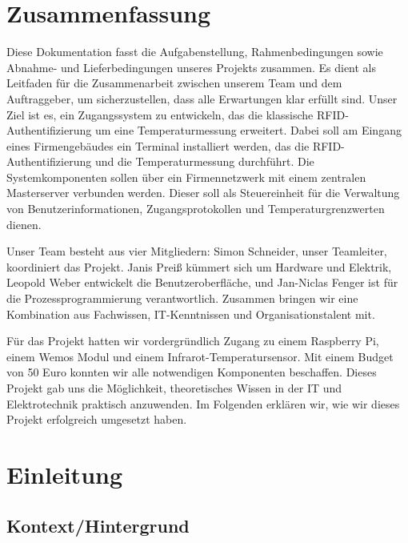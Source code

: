 
\section{Zusammenfassung}\label{sec:zusammenfassung}


Diese Dokumentation fasst die Aufgabenstellung, Rahmenbedingungen sowie Abnahme- und Lieferbedingungen unseres Projekts zusammen. Es dient als Leitfaden für die Zusammenarbeit zwischen unserem Team und dem Auftraggeber, um sicherzustellen, dass alle Erwartungen klar erfüllt sind. Unser Ziel ist es, ein Zugangssystem zu entwickeln, das die klassische RFID-Authentifizierung um eine Temperaturmessung erweitert. Dabei soll am Eingang eines Firmengebäudes ein Terminal installiert werden, das die RFID-Authentifizierung und die Temperaturmessung durchführt. Die Systemkomponenten sollen über ein Firmennetzwerk mit einem zentralen Masterserver verbunden werden. Dieser soll als Steuereinheit für die Verwaltung von Benutzerinformationen, Zugangsprotokollen und Temperaturgrenzwerten dienen.

\vspace{1em}
\noindent Unser Team besteht aus vier Mitgliedern: Simon Schneider, unser Teamleiter, koordiniert das Projekt. Janis Preiß kümmert sich um Hardware und Elektrik, Leopold Weber entwickelt die Benutzeroberfläche, und Jan-Niclas Fenger ist für die Prozessprogrammierung verantwortlich. Zusammen bringen wir eine Kombination aus Fachwissen, IT-Kenntnissen und Organisationstalent mit.

\vspace{1em}
\noindent Für das Projekt hatten wir vordergründlich Zugang zu einem Raspberry Pi, einem Wemos Modul und einem Infrarot-Temperatursensor. Mit einem Budget von 50 Euro konnten wir alle notwendigen Komponenten beschaffen. Dieses Projekt gab uns die Möglichkeit, theoretisches Wissen in der IT und Elektrotechnik praktisch anzuwenden. Im Folgenden erklären wir, wie wir dieses Projekt erfolgreich umgesetzt haben.

\section{Einleitung}\label{sec:einleitung}


\subsection{Kontext/Hintergrund}

